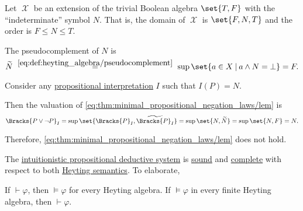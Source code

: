 \begin{example}\label{ex:heyting_semantics_lem_counterexample}
  Let \( \mscrX \) be an extension of the trivial Boolean algebra \( \set{ T, F } \) with the \enquote{indeterminate} symbol \( N \). That is, the domain of \( \mscrX \) is \( \set{ F, N, T } \) and the order is \( F \leq N \leq T \).

  The pseudocomplement of \( N \) is
  \begin{equation*}
    \widetilde{N}
    \reloset {\eqref{eq:def:heyting_algebra/pseudocomplement}} =
    \sup\set{ a \in X \given a \wedge N = \bot }
    =
    F.
  \end{equation*}

  Consider any \hyperref[def:propositional_valuation]{propositional interpretation} \( I \) such that \( I(P) = N \).

  Then the valuation of \eqref{eq:thm:minimal_propositional_negation_laws/lem} is
  \begin{equation*}
    \Bracks{P \vee \neg P}_I
    =
    \sup\set{ \Bracks{P}_I, \widetilde{\Bracks{P}_I} }
    =
    \sup\set{ N, \widetilde{N} }
    =
    \sup\set{ N, F }
    =
    N.
  \end{equation*}

  Therefore, \eqref{eq:thm:minimal_propositional_negation_laws/lem} does not hold.
\end{example}

\begin{theorem}\label{thm:intuitionistic_propositional_logic_is_sound_and_complete}
  The \hyperref[def:intuitionistic_propositional_deductive_systems]{intuitionistic propositional deductive system} is \hyperref[def:derivability_and_satisfiability/soundness]{sound} and \hyperref[def:derivability_and_satisfiability/completeness]{complete} with respect to both \hyperref[def:propositional_heyting_algebra_semantics]{Heyting semantics}. To elaborate,
  \begin{thmenum}
     If \( \vdash \varphi \), then \( \vDash \varphi \) for every Heyting algebra.
     If \( \vDash \varphi \) in every finite Heyting algebra, then \( \vdash \varphi \).
  \end{thmenum}
\end{theorem}

